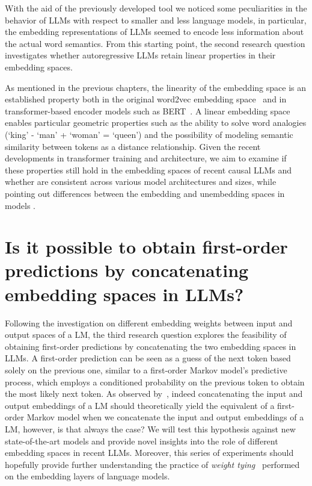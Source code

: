 With the aid of the previously developed tool we noticed some peculiarities in the behavior of LLMs with respect to smaller and less  language models, in particular, the embedding representations of LLMs seemed to encode less information about the actual word semantics.
From this starting point, the second research question investigates whether autoregressive LLMs retain linear properties in their embedding spaces.

As mentioned in the previous chapters, the linearity of the embedding space is an established property both in the original word2vec embedding space~\cite{mikolov2013} and in transformer-based encoder models such as BERT~\cite{devlin2019}.
A linear embedding space enables particular geometric properties such as the ability to solve word analogies (`king' - `man' + `woman' = `queen') and the possibility of modeling semantic similarity between tokens as a distance relationship.
Given the recent developments in transformer training and architecture, we aim to examine if these properties still hold in the embedding spaces of recent causal LLMs and whether  are consistent across various model architectures and sizes, while pointing out differences between the embedding and unembedding spaces in models .

\section{Is it possible to obtain first-order \texorpdfstring{ \\ }{} \mbox{predictions} by \mbox{concatenating} \texorpdfstring{ \\ }{} embedding spaces in LLMs?} \label{sec:rq_3}

Following the investigation on different embedding weights between input and output spaces of a LM, the third research question explores the feasibility of obtaining first-order predictions by concatenating the two embedding spaces in LLMs.
A first-order prediction can be seen as a guess of the next token based solely on the previous one, similar to a first-order Markov model's predictive process, which employs a conditioned probability on the previous token to obtain the most likely next token.
As observed by~\citet{elhage2021}, indeed concatenating the input and output embeddings of a LM should theoretically yield the equivalent of a first-order Markov model when we concatenate the input and output embeddings of a LM, however, is that always the case?
We will test this hypothesis against new state-of-the-art models and provide novel insights into the role of different embedding spaces in recent LLMs.
Moreover, this series of experiments should hopefully provide further understanding  the practice of \emph{weight tying}~\cite{inan2017,press2017} performed on the embedding layers of language models.